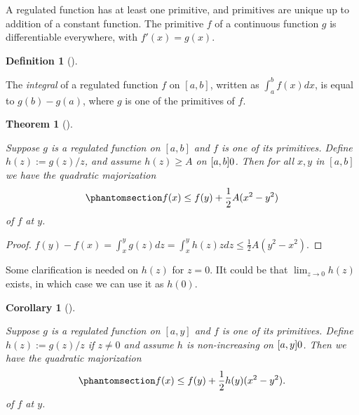 \documentclass[
  12pt,
  letterpaper,
  DIV=11,
  numbers=noendperiod]{scrartcl}
\theoremstyle{plain}
\newtheorem{theorem}{Theorem}[section]
\theoremstyle{plain}
\theoremstyle{plain}
\newtheorem{corollary}{Corollary}[section]
\theoremstyle{definition}
\newtheorem{definition}{Definition}[section]
\theoremstyle{remark}
\begin{document}
A regulated function has at least one primitive, and primitives are
unique up to addition of a constant function. The primitive \(f\) of a
continuous function \(g\) is differentiable everywhere, with
\(f'(x)=g(x)\).

\begin{definition}[]\protect\hypertarget{def-integral}{}\label{def-integral}

The \emph{integral} of a regulated function \(f\) on \([a,b]\), written
as \(\int_a^b f(x)dx\), is equal to \(g(b)-g(a)\), where \(g\) is one of
the primitives of \(f\).

\end{definition}

\begin{theorem}[]\protect\hypertarget{thm-dll}{}\label{thm-dll}

Suppose \(g\) is a regulated function on \([a,b]\) and \(f\) is one of
its primitives. Define \(h(z):=g(z)/z\), and assume \(h(z)\geq A\) on
\([a,b]\\0\). Then for all \(x,y\) in \([a,b]\) we have the quadratic
majorization \begin{equation}\phantomsection\label{eq-amajor1}{
f(x)\leq f(y)+\frac12 A(x^2-y^2)
}\end{equation} of \(f\) at \(y\).

\end{theorem}

\begin{proof}
\(f(y)-f(x)=\int_x^y g(z)dz=\int_x^yh(z)zdz\leq \frac12A(y^2-x^2)\).
\end{proof}

Some clarification is needed on \(h(z)\) for \(z=0\). IIt could be that
\(\lim_{z\rightarrow 0}h(z)\) exists, in which case we can use it as
\(h(0)\).

\begin{corollary}[]\protect\hypertarget{cor-dcor}{}\label{cor-dcor}

Suppose \(g\) is a regulated function on \([a,y]\) and \(f\) is one of
its primitives. Define \(h(z):=g(z)/z\) if \(z\not= 0\) and assume \(h\)
is non-increasing on \([a,y]\\0\). Then we have the quadratic
majorization
\begin{equation}\phantomsection\label{eq-amajor}{f(x)\leq f(y)+\frac12h(y)(x^2-y^2).}\end{equation}
of \(f\) at \(y\).

\end{corollary}
\end{document}
